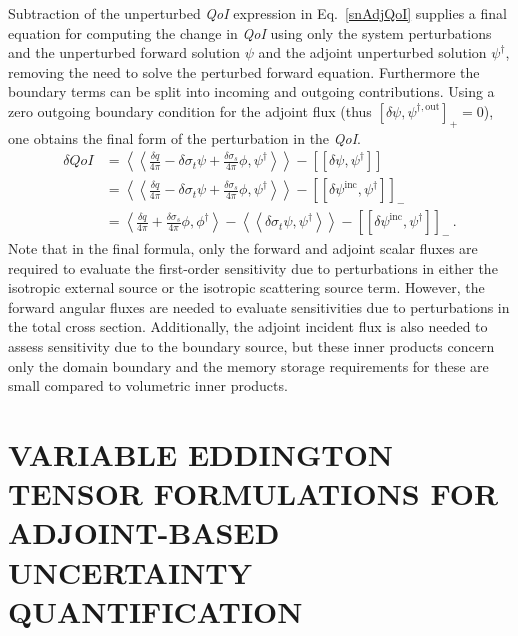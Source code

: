 \documentclass[12pt]{report}
\newcommand{\bra}{\left\langle}
\newcommand{\ket}{\right\rangle}
\newcommand{\braSN}{\left\langle \! \left\langle}
\newcommand{\ketSN}{\right\rangle \! \right\rangle}
\newcommand{\sbraSN}{\left[ \! \left[}
\newcommand{\sketSN}{\right] \! \right]}
\newcommand{\sbra}{\left[}
\newcommand{\sket}{\right]}
\newcommand{\sigt}{\sigma_t}
\newcommand{\sigs}{\sigma_s}
\newcommand{\angSourced}{\frac{\delta q}{4 \pi}}
\newcommand{\qoi}{{\it QoI}\xspace}
\begin{document}
Subtraction of the unperturbed \qoi expression in Eq.~\eqref{snAdjQoI} supplies a final equation for computing the change in \qoi using only the system perturbations and the unperturbed forward solution $\psi$ and the adjoint unperturbed
solution $\psi^\dag$, removing the need to solve the perturbed forward equation. 
Furthermore the boundary terms can be split into incoming and outgoing contributions.
Using a zero outgoing boundary condition for the adjoint flux
(thus $\sbra \delta \psi, \psi^{\dag,\text{out}} \sket_+=0$), one obtains the final 
form of the perturbation in the \qoi.
\begin{equation}
\label{snSens}
\begin{split}
\delta QoI &= \braSN \frac{\delta q}{4\pi} - \delta \sigt \psi + \frac{\delta\sigs}{4 \pi} \phi  , \psi^\dag  \ketSN - \sbraSN \delta \psi, \psi^\dag \sketSN \\
&= \braSN \angSourced - \delta \sigt \psi + \frac{\delta\sigs}{4 \pi} \phi , \psi^\dag  \ketSN - \sbraSN \delta \psi^{\text{inc}}, \psi^\dag \sketSN_- \\
&= \bra \angSourced  + \frac{\delta\sigs}{4 \pi} \phi , \phi^\dag  \ket - \braSN  \delta \sigt \psi , \psi^\dag \ketSN - \sbraSN \delta \psi^{\text{inc}}, \psi^\dag \sketSN_- \,.
\end{split}
\end{equation}
Note that in the final formula, only the forward and adjoint scalar fluxes
are required to evaluate the first-order sensitivity due to perturbations in either the isotropic external source or the isotropic scattering source term. However, the forward angular fluxes are needed to evaluate sensitivities due to perturbations in the total cross section. Additionally, the adjoint incident flux
is also needed to assess sensitivity due to the boundary source, but these inner
products concern only the domain boundary and the memory storage requirements for these are small compared to volumetric inner products.

\chapter{\uppercase {Variable Eddington Tensor Formulations For Adjoint-based Uncertainty Quantification}} \label{chap:VET}

\end{document}
